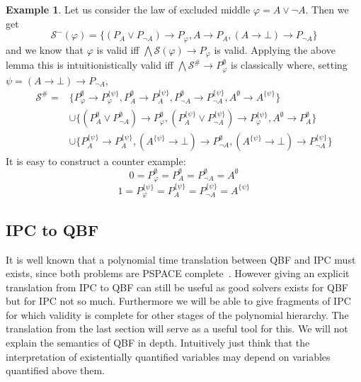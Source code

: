 \documentclass[a4paper,12pt]{report}
\theoremstyle{definition}
\theoremstyle{definition}
\theoremstyle{definition}
\theoremstyle{definition}
\theoremstyle{definition}
\theoremstyle{definition}
\newtheorem{example}[theorem]{Example}
\theoremstyle{definition}
\begin{document}
	\begin{example}
		Let us consider the law of excluded middle $\varphi = A\vee\neg A$. Then we get
		$$\mathcal S^-(\varphi) = \{(P_A\vee P_{\neg A})\to P_\varphi, A\to P_A, (A\to \bot)\to P_{\neg A}\}$$
		and we know that $\varphi$ is valid iff $\bigwedge \mathcal S(\varphi)\to P_\varphi$ is valid. Applying the above lemma this is intuitionistically valid iff $\bigwedge\mathcal S^\#\to P^\emptyset_\varphi$ is classically where, setting $\psi = (A\to \bot)\to P_{\neg A}$,
		\begin{align*}
			\mathcal S^\# =&\{P_\varphi^\emptyset\to P_\varphi^{\{\psi\}}, P_A^\emptyset\to P_A^{\{\psi\}},P_{\neg A}^\emptyset\to P_{\neg A}^{\{\psi\}},A^\emptyset\to A^{\{\psi\}}\}\\ &\cup\{(P_A^\emptyset\vee P_{\neg A}^\emptyset)\to P_\varphi^\emptyset, (P_A^{\{\psi\}}\vee P_{\neg A}^{\{\psi\}})\to P_\varphi^{\{\psi\}},  A^\emptyset\to P_A^\emptyset\}\\ &\cup \{P_A^{\{\psi\}}\to P_A^{\{\psi\}}, (A^{\{\psi\}}\to \bot)\to P_{\neg A}^\emptyset, (A^{\{\psi\}}\to \bot)\to P_{\neg A}^{\{\psi\}}\}
		\end{align*}
		It is easy to construct a counter example:
		$$0 = P_\varphi^\emptyset  = P_A^\emptyset = P_{\neg A}^\emptyset = A^\emptyset$$
		$$1=  P_{\varphi}^{\{\psi\}} = P_A^{\{\psi\}} =  P_{\neg A}^{\{\psi\}} = A^{\{\psi\}} $$
	\end{example}	

	\subsection{IPC to QBF}
	
	It is well known that a polynomial time translation between QBF and IPC must exists, since both problems are PSPACE complete~\cite{garey1979computers, statman1979intuitionistic}. However giving an explicit translation from IPC to QBF can still be useful as good solvers exists for QBF but for IPC not so much. Furthermore we will be able to give fragments of IPC for which validity is complete for other stages of the polynomial hierarchy. The translation from the last section will serve as a useful tool for this. We will not explain the semantics of QBF in depth. Intuitively just think that the interpretation of existentially quantified variables may depend on variables quantified above them.
	
\end{document}
